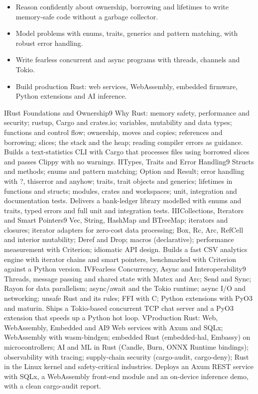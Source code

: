 \begin{itemize}
\item Reason confidently about ownership, borrowing and lifetimes to write memory-safe code without a garbage collector.
\item Model problems with enums, traits, generics and pattern matching, with robust error handling.
\item Write fearless concurrent and async programs with threads, channels and Tokio.
\item Build production Rust: web services, WebAssembly, embedded firmware, Python extensions and AI inference.
\end{itemize}

\unit{I}{Rust Foundations and Ownership}{9}{%
Why Rust: memory safety, performance and security; rustup, Cargo and crates.io; variables, mutability and data types;
functions and control flow; ownership, moves and copies; references and borrowing; slices; the stack and the heap;
reading compiler errors as guidance.}
{Builds a text-statistics CLI with Cargo that processes files using borrowed slices and passes Clippy with no warnings.}
\unit{II}{Types, Traits and Error Handling}{9}{%
Structs and methods; enums and pattern matching; Option and Result; error handling with ?, thiserror and anyhow;
traits, trait objects and generics; lifetimes in functions and structs; modules, crates and workspaces;
unit, integration and documentation tests.}
{Delivers a bank-ledger library modelled with enums and traits, typed errors and full unit and integration tests.}
\unit{III}{Collections, Iterators and Smart Pointers}{9}{%
Vec, String, HashMap and BTreeMap; iterators and closures; iterator adapters for zero-cost data processing;
Box, Rc, Arc, RefCell and interior mutability; Deref and Drop; macros (declarative); performance measurement with Criterion;
idiomatic API design.}
{Builds a fast CSV analytics engine with iterator chains and smart pointers, benchmarked with Criterion against a Python version.}
\unit{IV}{Fearless Concurrency, Async and Interoperability}{9}{%
Threads, message passing and shared state with Mutex and Arc; Send and Sync; Rayon for data parallelism;
async/await and the Tokio runtime; async I/O and networking; unsafe Rust and its rules;
FFI with C; Python extensions with PyO3 and maturin.}
{Ships a Tokio-based concurrent TCP chat server and a PyO3 extension that speeds up a Python hot loop.}
\unit{V}{Production Rust: Web, WebAssembly, Embedded and AI}{9}{%
Web services with Axum and SQLx; WebAssembly with wasm-bindgen; embedded Rust (embedded-hal, Embassy) on microcontrollers;
AI and ML in Rust (Candle, Burn, ONNX Runtime bindings); observability with tracing;
supply-chain security (cargo-audit, cargo-deny); Rust in the Linux kernel and safety-critical industries.}
{Deploys an Axum REST service with SQLx, a WebAssembly front-end module and an on-device inference demo, with a clean cargo-audit report.}

